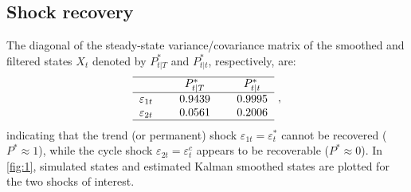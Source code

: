 \documentclass[a4paper,final,12pt]{article}
\begin{document}
\subsection{Shock recovery}

The diagonal of the steady-state variance/covariance matrix of the smoothed
and filtered states $X_{t}$ denoted by $P_{t|T}^{\ast }$ and $P_{t|t}^{\ast }
$, respectively, are:%
\begin{equation}
\begin{tabular}{lcccc}
\hline
&  & $P_{t|T}^{\ast }$ &  & $P_{t|t}^{\ast }$ \\ \hline
{$\varepsilon _{1t}$} &  & $0.9439$ &  & $0.9995$ \\ 
{$\varepsilon _{2t}$} &  & $0.0561$ &  & $0.2006$ \\ \hline
\end{tabular}%
~,  \label{Pstar}
\end{equation}%
indicating that the trend (or permanent) shock $\varepsilon
_{1t}=\varepsilon _{t}^{\ast }$ cannot be recovered ($P^{\ast }\approx 1$),
while the cycle shock $\varepsilon _{2t}=\varepsilon _{t}^{c}$ appears to be
recoverable ($P^{\ast }\approx 0$). In \autoref{fig:1}, simulated states and
estimated Kalman smoothed states are plotted for the two shocks of interest.
\end{document}
